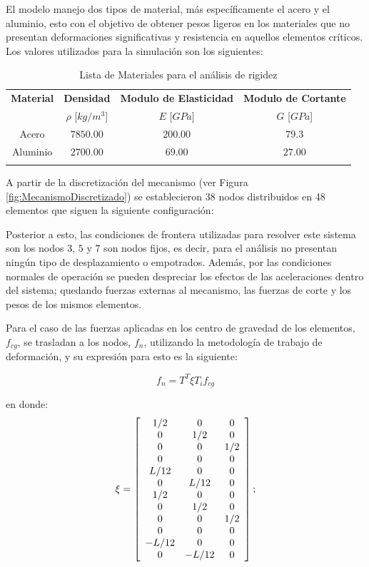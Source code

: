 El modelo manejo dos tipos de material, más específicamente el acero y el aluminio, esto con el objetivo de obtener pesos ligeros en los materiales que no presentan deformaciones significativas y resistencia en aquellos elementos críticos. Los valores utilizados para la simulación son los siguientes:

\begin{longtable}{|c|c|c|c|}
    \hline \rowcolor[gray]{0.85}
    \textbf{Material} & \textbf{Densidad} & \textbf{Modulo de Elasticidad} & \textbf{Modulo de Cortante} \\ \rowcolor[gray]{0.85}
     & $\rho$ [$kg/m^3$] & $E$ [$GPa$] & $G$ [$GPa$] \\ \hline
     Acero & $7850.00$ & $200.00$ & $79.3$ \\ \hline
     Aluminio & $2700.00$ & $69.00$ & $27.00$ \\ \hline
     \caption{Lista de Materiales para el análisis de rigidez}
\end{longtable}

A partir de la discretización del mecanismo (ver Figura \ref{fig:MecanismoDiscretizado}) se establecieron 38 nodos distribuidos en 48 elementos que siguen la siguiente configuración:



Posterior a esto, las condiciones de frontera utilizadas para resolver este sistema son los nodos $3$, $5$ y $7$ son nodos fijos, es decir, para el análisis no presentan ningún tipo de desplazamiento o empotrados. Además, por las condiciones normales de operación se pueden despreciar los efectos de las aceleraciones dentro del sistema; quedando fuerzas externas al mecanismo, las fuerzas de corte y los pesos de los mismos elementos.

Para el caso de las fuerzas aplicadas en los centro de gravedad de los elementos, $f_{cg}$, se trasladan a los nodos, $f_{n}$, utilizando la metodología de trabajo de deformación, y su expresión para esto es la siguiente:

\begin{equation}
    f_{n} = T^T \xi T_{i} f_{cg}
\end{equation}

en donde:
\begin{equation}
    \xi = \left[\begin{array}{c c c}
            1/2&0&0\\0&1/2&0\\0&0&1/2\\0&0&0\\L/12&0&0\\0&L/12&0\\
            1/2&0&0\\0&1/2&0\\0&0&1/2\\0&0&0\\-L/12&0&0\\0&-L/12&0
    \end{array} \right];
\end{equation}